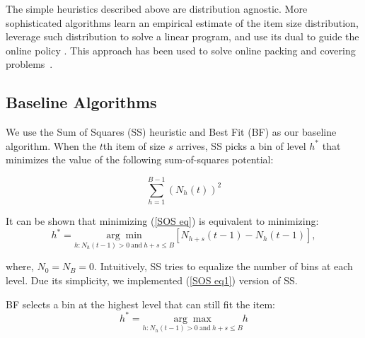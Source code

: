 The simple heuristics described above are distribution agnostic. More sophisticated algorithms learn an empirical estimate of the item size distribution, leverage such distribution to solve a linear program, and use its dual to guide the online policy \cite{AdelmanNem1999}\cite{RheeTalagrand1993}\cite{IyengarSigman2004}. This approach has been used to solve online packing and covering problems~\cite{GuptaMolinaro2014}\cite{AgrawalDevanur2015}.


\subsection{Baseline Algorithms}
We use the Sum of Squares (SS) heuristic and Best Fit (BF) as our baseline algorithm. 
When the $t$th item of size $s$ arrives, SS picks a bin of level $h^*$ that minimizes the value of the following sum-of-squares potential:

\begin{equation}
\sum_{h=1}^{B-1} (N_{h}(t))^2 \label{SOS eq}
\end{equation}

\noindent It can be shown that minimizing (\ref{SOS eq}) is equivalent to minimizing:
\begin{equation}
h^* = \underset{h:N_h(t-1)>0 \ \text{and} \ h+s \leq B}{\arg\min} [N_{h+s}(t-1) - N_h(t-1)], \label{SOS eq1}
\end{equation}

\noindent where, $N_0 = N_B = 0$. Intuitively, SS tries to equalize the number of bins at each level. Due its simplicity, we implemented (\ref{SOS eq1}) version of SS.

BF selects a bin at the highest level that can still fit the item:
\begin{equation}
h^* = \underset{h:N_h(t-1)>0 \ \text{and} \ h+s \leq B}{\arg\max} h
\end{equation}
